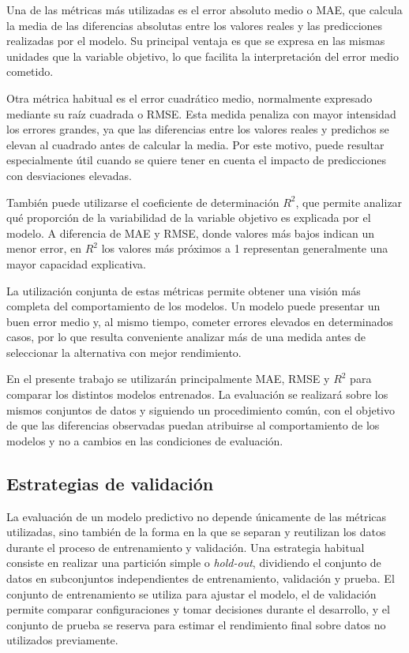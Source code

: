\documentclass[IB]{TFUOC}%
\begin{document}
Una de las métricas más utilizadas es el error absoluto medio o MAE, que calcula la media de las diferencias absolutas entre los valores reales y las predicciones realizadas por el modelo. Su principal ventaja es que se expresa en las mismas unidades que la variable objetivo, lo que facilita la interpretación del error medio cometido.

Otra métrica habitual es el error cuadrático medio, normalmente expresado mediante su raíz cuadrada o RMSE. Esta medida penaliza con mayor intensidad los errores grandes, ya que las diferencias entre los valores reales y predichos se elevan al cuadrado antes de calcular la media. Por este motivo, puede resultar especialmente útil cuando se quiere tener en cuenta el impacto de predicciones con desviaciones elevadas.

También puede utilizarse el coeficiente de determinación $R^2$, que permite analizar qué proporción de la variabilidad de la variable objetivo es explicada por el modelo. A diferencia de MAE y RMSE, donde valores más bajos indican un menor error, en $R^2$ los valores más próximos a 1 representan generalmente una mayor capacidad explicativa.

La utilización conjunta de estas métricas permite obtener una visión más completa del comportamiento de los modelos. Un modelo puede presentar un buen error medio y, al mismo tiempo, cometer errores elevados en determinados casos, por lo que resulta conveniente analizar más de una medida antes de seleccionar la alternativa con mejor rendimiento.

En el presente trabajo se utilizarán principalmente MAE, RMSE y $R^2$ para comparar los distintos modelos entrenados. La evaluación se realizará sobre los mismos conjuntos de datos y siguiendo un procedimiento común, con el objetivo de que las diferencias observadas puedan atribuirse al comportamiento de los modelos y no a cambios en las condiciones de evaluación.

\subsection{Estrategias de validación}

La evaluación de un modelo predictivo no depende únicamente de las métricas utilizadas, sino también de la forma en la que se separan y reutilizan los datos durante el proceso de entrenamiento y validación. Una estrategia habitual consiste en realizar una partición simple o \textit{hold-out}, dividiendo el conjunto de datos en subconjuntos independientes de entrenamiento, validación y prueba. El conjunto de entrenamiento se utiliza para ajustar el modelo, el de validación permite comparar configuraciones y tomar decisiones durante el desarrollo, y el conjunto de prueba se reserva para estimar el rendimiento final sobre datos no utilizados previamente.
\end{document}

